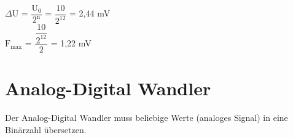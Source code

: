 \begin{enumerate}
	$\Delta$U = $\dfrac{\text{U}_0}{2^\text{n}}$ = $\dfrac{10}{2^{12}}$ = 2,44 mV \\
	
	$\text{F}_{\text{max}}$ = $\dfrac{ \dfrac{10}{2^{12}} }{2}$ = 1,22 mV

\end{enumerate}

\section{Analog-Digital Wandler}
Der Analog-Digital Wandler muss beliebige Werte (analoges Signal) in eine Binärzahl übersetzen.
